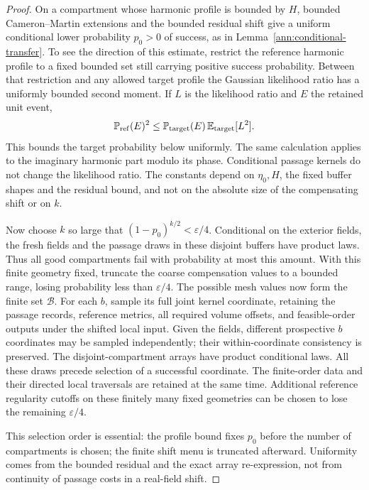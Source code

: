 \documentclass[11pt]{article}
\numberwithin{equation}{section}
\theoremstyle{definition}
\theoremstyle{remark}
\newcommand{\PP}{\mathbb P}
\newcommand{\EE}{\mathbb E}
\newcommand{\1}{\mathbf 1}
\begin{document}
\begin{proof}
On a compartment whose harmonic profile is bounded by $H$, bounded
Cameron--Martin extensions and the bounded residual shift give a
uniform conditional lower probability $p_0>0$ of success, as in
Lemma~\ref{ann:conditional-transfer}.  To see the
direction of this estimate, restrict the reference harmonic profile
to a fixed bounded set still carrying positive success probability.
Between that restriction and any allowed target profile the Gaussian
likelihood ratio has a uniformly bounded second moment.  If $L$ is
the likelihood ratio and $E$ the retained unit event,
\[
 \PP_{\rm ref}(E)^2
 \leq \PP_{\rm target}(E)\,
       \EE_{\rm target}[L^2].
\]
This bounds the target probability below uniformly.  The same
calculation applies to the imaginary harmonic part modulo its phase.
Conditional passage kernels do not change the likelihood ratio.
The constants depend on $\eta_0,H$, the fixed buffer shapes and the
residual bound, and not on the absolute size of the compensating
shift or on $k$.

Now choose $k$ so large that $(1-p_0)^{k/2}<\varepsilon/4$.
Conditional on the exterior fields, the fresh fields and the passage
draws in these disjoint buffers have product laws.  Thus all good
compartments fail with probability at most this amount.  With this
finite geometry fixed, truncate the coarse compensation values to a
bounded range, losing probability less than $\varepsilon/4$.
The possible mesh values now form the finite set $\mathcal B$.
For each $b$, sample its full joint kernel coordinate, retaining the
passage records, reference metrics, all required volume offsets, and
feasible-order outputs under the shifted local input.  Given the
fields, different prospective $b$ coordinates may be sampled
independently; their within-coordinate consistency is preserved.
The disjoint-compartment arrays have product conditional laws.
All these draws precede selection of a successful coordinate.
The finite-order data and their directed local traversals are
retained at the same time.  Additional reference
regularity cutoffs on these finitely many fixed geometries can be
chosen to lose the remaining $\varepsilon/4$.

This selection order is essential: the profile bound fixes $p_0$
before the number of compartments is chosen; the finite shift menu is
truncated afterward.  Uniformity comes from the bounded residual and
the exact array re-expression, not from continuity of passage costs
in a real-field shift.
\end{proof}
\end{document}
